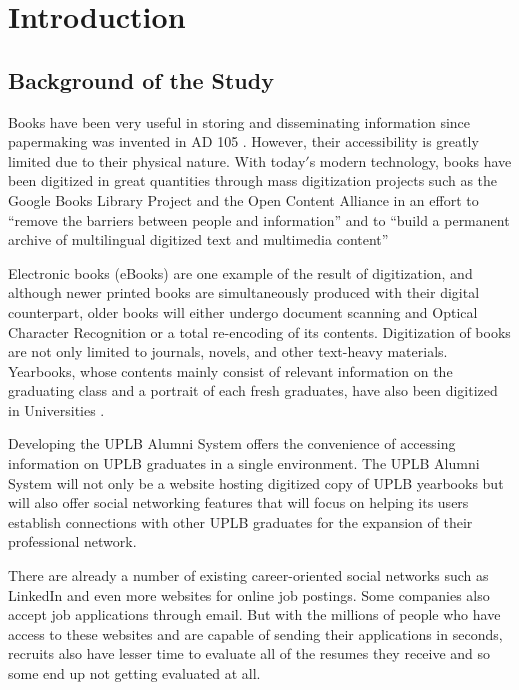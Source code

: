 \documentclass[journal]{./IEEE/IEEEtran}
\title{\SPTITLE}
\author{\ADVISEE~and~\ADVISER%
\REMARK
}
\begin{document}
\maketitle


\section{Introduction}

\subsection{Background of the Study}
Books have been very useful in storing and disseminating information since papermaking was invented in AD 105 \cite{electronic_eb_papermaking}. However, their accessibility is greatly limited due to their physical nature. With today$'$s modern technology, books have been digitized in great quantities through mass digitization projects such as the Google Books Library Project \cite{electronic_glibproj} and the Open Content Alliance \cite{electronic_oca} in an effort to “remove the barriers between people and information” \cite{electronic_glibproj_perspective} and to “build a permanent archive of multilingual digitized text and multimedia content” \cite{electronic_oca_about}

Electronic books (eBooks) are one example of the result of digitization, and although newer printed books are simultaneously produced with their digital counterpart, older books will either undergo document scanning and Optical Character Recognition or a total re-encoding of its contents.
Digitization of books are not only limited to journals, novels, and other text-heavy materials. Yearbooks, whose contents mainly consist of relevant information on the graduating class and a portrait of each fresh graduates, have also been digitized in Universities \cite{article_51_yearbooks}. \par

Developing the UPLB Alumni System offers the convenience of accessing information on UPLB graduates in a single environment. The UPLB Alumni System will not only be a website hosting digitized copy of UPLB yearbooks but will also offer social networking features that will focus on helping its users establish connections with other UPLB graduates for the expansion of their professional network. \par

There are already a number of existing career-oriented social networks such as LinkedIn and even more websites for online job postings. Some companies also accept job applications through email. But with the millions of people who have access to these websites and are capable of sending their applications in seconds, recruits also have lesser time to evaluate all of the resumes they receive and so some end up not getting evaluated at all\cite{6615172220111003}. \par
\end{document}
